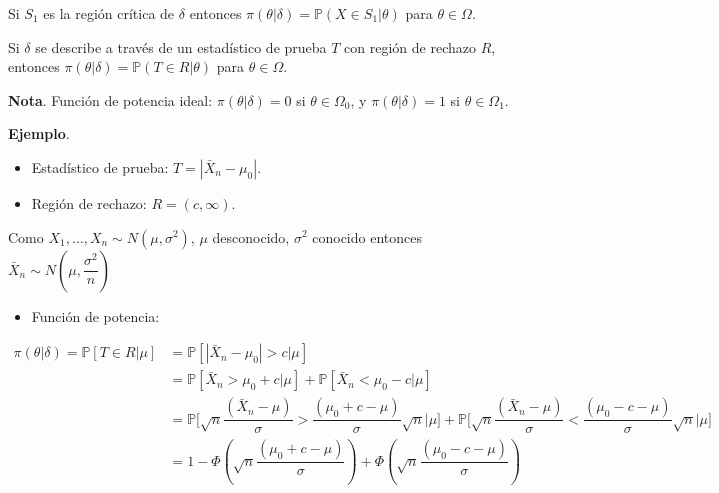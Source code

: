 \documentclass[
  12pt,
]{book}
\providecommand{\tightlist}{%
  \setlength{\itemsep}{0pt}\setlength{\parskip}{0pt}}
\begin{document}
Si \(S_1\) es la región crítica de \(\delta\) entonces
\(\pi(\theta|\delta) = \mathbb P(X\in S_1|\theta)\) para
\(\theta\in\Omega\).

Si \(\delta\) se describe a través de un estadístico de prueba \(T\) con región de
rechazo \(R\), entonces \(\pi(\theta|\delta) = \mathbb P(T \in R|\theta)\) para
\(\theta\in\Omega\).

\textbf{Nota}. Función de potencia ideal: \(\pi(\theta|\delta) = 0\) si
\(\theta\in\Omega_0\), y \(\pi(\theta|\delta) = 1\) si \(\theta\in\Omega_1\).

\textbf{Ejemplo}.

\begin{itemize}
\item
  Estadístico de prueba: \(T = |\bar X_n-\mu_0|\).
\item
  Región de rechazo: \(R = (c,\infty)\).
\end{itemize}

Como \(X_1,\dots, X_n \sim N(\mu, \sigma^2)\), \(\mu\) desconocido, \(\sigma^2\) conocido entonces \(\bar X_n \sim N\left(\mu,\dfrac{\sigma^2}{n}\right)\)

\begin{itemize}
\tightlist
\item
  Función de potencia:
\end{itemize}

\begin{align*}
\pi(\theta|\delta) = \mathbb P[T\in R|\mu] & = \mathbb P [|\bar X_n -\mu_0|>c|\mu] \\ &= \mathbb P [\bar X_n > \mu_0+c|\mu] + \mathbb P [\bar X_n < \mu_0-c|\mu]\\
& =  \mathbb P \bigg[\sqrt n \dfrac{(\bar X_n-\mu)}{\sigma}> \dfrac{(\mu_0+c-\mu)}{\sigma}\sqrt n \bigg|\mu\bigg] +  \mathbb P \bigg[\sqrt n \dfrac{(\bar X_n-\mu)}{\sigma}< \dfrac{(\mu_0-c-\mu)}{\sigma}\sqrt n \bigg|\mu\bigg] \\
& = 1-\Phi\left(\sqrt n \dfrac{(\mu_0+c-\mu)}{\sigma} \right) + \Phi\left(\sqrt n \dfrac{(\mu_0-c-\mu)}{\sigma} \right) 
\end{align*}
\end{document}
